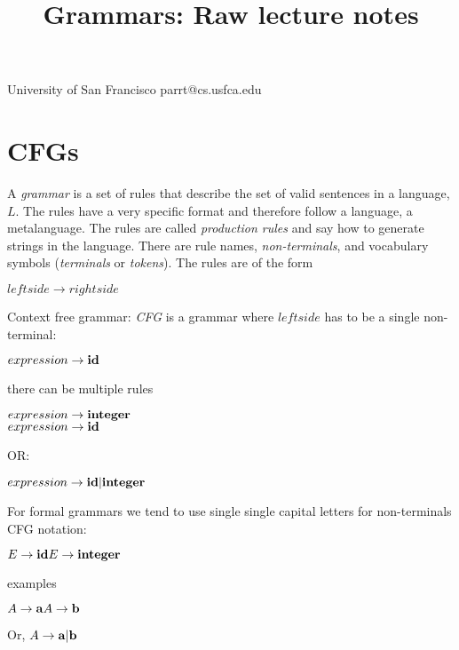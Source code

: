 \documentclass[11pt,twocolumn,nocopyright]{sigplanconf}
\begin{document}
\title{Grammars: Raw lecture notes}

           {University of San Francisco\vspace{-1mm}}
           {parrt@cs.usfca.edu}

\maketitle

\begin{abstract}
\end{abstract}

\section{CFGs}

A {\em grammar} is a set of rules that describe the set of valid sentences in a language, $L$. The rules have a very specific format and therefore follow a language, a metalanguage. The rules are called {\em production rules} and say how to generate strings in the language. There are rule names, {\em non-terminals}, and vocabulary symbols ({\em terminals} or {\em tokens}). The rules are of the form

$leftside \rightarrow rightside$

Context free grammar: {\em CFG} is a grammar where $leftside$ has to be a single non-terminal:

$expression \rightarrow {\bf id}$

there can be multiple rules

\noindent $expression \rightarrow {\bf integer}$\\
$expression \rightarrow {\bf id}$

OR:

$expression \rightarrow {\bf id} | {\bf integer}$


For formal grammars we tend to use single single capital letters for non-terminals CFG notation:

\noindent $
E \rightarrow {\bf id} \\
E \rightarrow {\bf integer}$

 examples
 
\noindent $
A \rightarrow {\bf a} \\
A \rightarrow {\bf b} \\
$

Or, $A \rightarrow {\bf a} | {\bf b}$
\end{document}
